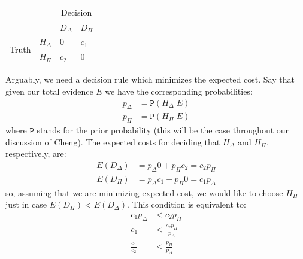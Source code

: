 \documentclass{ifcolog}
\newcommand{\pr}[1]{\mbox{$\mathtt{P}(#1)$}}
\begin{document}
\begin{center}
\begin{tabular}
{@{}llll@{}}
\toprule
& & \multicolumn{2}{c}{Decision}\\
& &  $D_\Delta$ & $D_\Pi$ \\
\cmidrule{3-4}
\multirow{2}{*}{Truth} &  $H_\Delta$    & $0$    & $c_1$\\
                       &  $H_\Pi$       &  $c_2$   & $0$ \\ 
\bottomrule
\end{tabular}
\end{center}



\noindent Arguably, we need a decision rule which minimizes the expected cost. Say that given our  total evidence $E$ we have the corresponding probabilities:
\begin{align*}
p_\Delta &= \pr{H_\Delta \vert E} \\
p_\Pi & = \pr{H_\Pi \vert E}
\end{align*}
\noindent where $\mathtt{P}$ stands for the prior probability (this will be the case throughout our discussion of Cheng). The expected costs for deciding that $H_\Delta$ and $H_\Pi$, respectively, are:
\begin{align*}
E(D_\Delta) & = p_\Delta 0 + p_\Pi c_2 = c_2p_\Pi\\
E(D_\Pi) & = p_\Delta c_1 + p_\Pi 0 = c_1 p_\Delta
\end{align*}
\noindent so, assuming that we are minimizing expected cost,   we would like to choose $H_\Pi$ just in case $E(D_\Pi) < E(D_\Delta)$. This condition is equivalent to:
\begin{align}
\nonumber c_1p_\Delta &< c_2p_\Pi \\
\nonumber c_1 & < \frac{c_2p_\Pi}{p_\Delta}\\
\label{eq:cheng_frac1}\frac{c_1}{c_2} & < \frac{p_\Pi}{p_\Delta}
\end{align}
\end{document}
